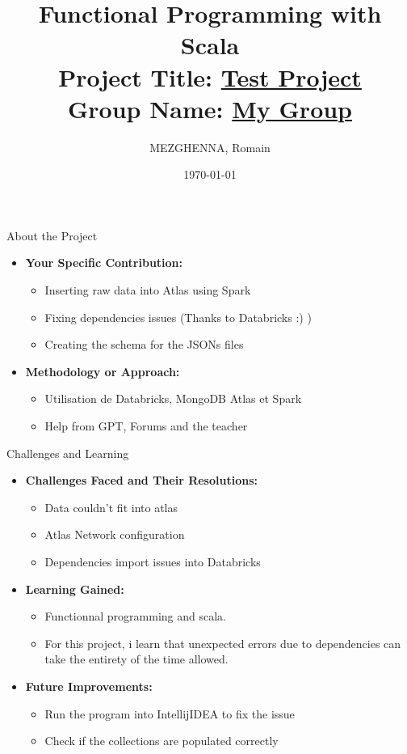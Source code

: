 \documentclass[serif, aspectratio=169]{beamer}
\title[Project Presentation]{Functional Programming with Scala \\ { \large Project Title: \underline{ Test Project \hspace{2cm}}}\\ {\small Group Name: \underline{ My Group \hspace{2cm} }}}
\author{MEZGHENNA, Romain}
\institute{ IG5\_Polytech}
\date{\small \today}
\begin{document}
\begin{frame}
    \titlepage
\end{frame}

\begin{frame}{About the Project}
    \begin{itemize}
        \item \textbf{Your Specific Contribution:}
        \begin{itemize}
            \item Inserting raw data into Atlas using Spark
            \item Fixing dependencies issues (Thanks to Databricks :) )
            \item Creating the schema for the JSONs files
        \end{itemize}
        \medskip
        \item \textbf{Methodology or Approach:}
        \begin{itemize}
            \item Utilisation de Databricks, MongoDB Atlas et Spark
            \item Help from GPT, Forums and the teacher
        \end{itemize}

    \end{itemize}
\end{frame}

\begin{frame}{Challenges and Learning}
    \begin{itemize}
        \item \textbf{Challenges Faced and Their Resolutions:}
        \begin{itemize}
            \item Data couldn't fit into atlas
            \item Atlas Network configuration
            \item Dependencies import issues into Databricks
        \end{itemize}
        \medskip
        \item \textbf{Learning Gained:}
        \begin{itemize}
            \item Functionnal programming and scala.
            \item For this project, i learn that unexpected errors due to dependencies can take the entirety of the time allowed.
        \end{itemize}
        \medskip
        \item \textbf{Future Improvements:}
        \begin{itemize}
            \item Run the program into IntellijIDEA to fix the issue
            \item Check if the collections are populated correctly
        \end{itemize}
    \end{itemize}
\end{frame}
\end{document}
